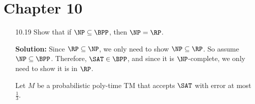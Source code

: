 \section{Chapter 10}

\begin{enumerate}

\item[10.19]Show that if $\NP \subseteq \BPP$, then $\NP = \RP$. 

\par \textbf{Solution:} Since $\RP \subseteq \NP$, we only need to show $\NP \subseteq \RP$. So assume $\NP \subseteq \BPP$. Therefore, $\SAT \in \BPP$, and since it is $\NP$-complete, we only need to show it is in $\RP$.

\par Let $M$ be a probabilistic poly-time TM that accepts $\SAT$ with error at most $\frac{1}{3}$. 

\end{enumerate}